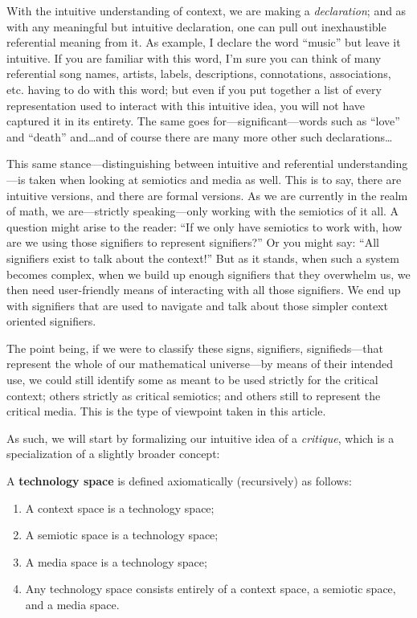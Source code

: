 \documentclass[twoside]{article}
\newenvironment{definition}[1][Definition]{\begin{trivlist}
\item[\hskip \labelsep {\bfseries #1:}]}{\end{trivlist}}
\begin{document}
With the intuitive understanding of context, we are making a \emph{declaration}; and as with any meaningful but intuitive
declaration, one can pull out inexhaustible referential meaning from it.  As example, I declare the word ``music'' but leave
it intuitive. If you are familiar with this word, I'm sure you can think of many referential song names, artists, labels,
descriptions, connotations, associations, etc. having to do with this word; but even if you put together a list of every
representation used to interact with this intuitive idea, you will not have captured it in its entirety.  The same goes
for---significant---words such as ``love'' and ``death'' and\ldots and of course there are many more other such declarations\ldots

This same stance---distinguishing between intuitive and referential understanding---is taken when looking at semiotics and media
as well.  This is to say, there are intuitive versions, and there are formal versions.  As we are currently in the realm of math,
we are---strictly speaking---only working with the semiotics of it all. A question might arise to the reader: ``If we only have
semiotics to work with, how are we using those signifiers to represent signifiers?'' Or you might say: ``All signifiers exist to talk
about the context!'' But as it stands, when such a system becomes complex, when we build up enough signifiers that they overwhelm us,
we then need user-friendly means of interacting with all those signifiers. We end up with signifiers that are used to navigate and
talk about those simpler context oriented signifiers.

The point being, if we were to classify these signs, signifiers, signifieds---that represent the whole of our mathematical
universe---by means of their intended use, we could still identify some as meant to be used strictly for the critical context;
others strictly as critical semiotics; and others still to represent the critical media. This is the type of viewpoint taken
in this article.

As such, we will start by formalizing our intuitive idea of a \emph{critique}, which is a specialization of a slightly
broader concept:

\begin{definition}[Technology Space]

A {\bfseries technology space} is defined axiomatically (recursively) as follows:

\begin{enumerate}
\item A context space is a technology space;
\item A semiotic space is a technology space;
\item A media space is a technology space;
\item Any technology space consists entirely of a context space, a semiotic space, and a media space.
\end{enumerate}

\end{definition}
\end{document}
